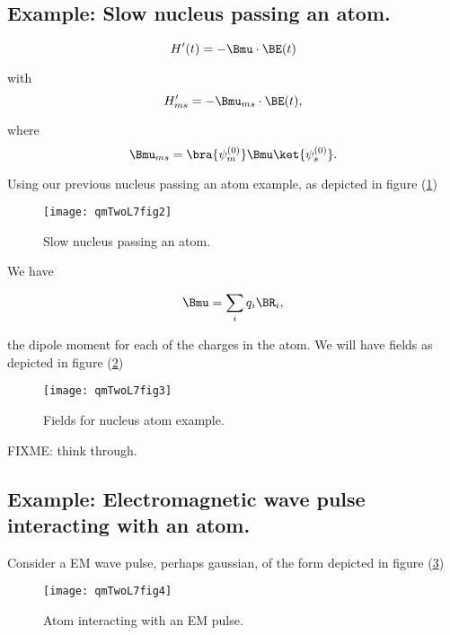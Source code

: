 \subsection{Example: Slow nucleus passing an atom.}

\begin{equation}\label{eqn:qmTwoL7:510}
H'(t) = - \Bmu \cdot \BE(t)
\end{equation}

with
\begin{equation}\label{eqn:qmTwoL7:530}
H_{ms}' = -\Bmu_{ms} \cdot \BE(t),
\end{equation}

where
\begin{equation}\label{eqn:qmTwoL7:550}
\Bmu_{ms} =
\bra{\psi_m^{(0)}}
\Bmu
\ket{\psi_s^{(0)}}.
\end{equation}

Using our previous nucleus passing an atom example, as depicted in figure (\ref{fig:qmTwoL7fig2})

\begin{figure}[htp]
\centering
\texttt{[image: qmTwoL7fig2]}
\caption{Slow nucleus passing an atom.}\label{fig:qmTwoL7fig2}
\end{figure}

We have

\begin{equation}\label{eqn:qmTwoL7:570}
\Bmu = \sum_i q_i \BR_i,
\end{equation}

the dipole moment for each of the charges in the atom.  We will have fields as depicted in figure (\ref{fig:qmTwoL7fig3})

\begin{figure}[htp]
\centering
\texttt{[image: qmTwoL7fig3]}
\caption{Fields for nucleus atom example.}\label{fig:qmTwoL7fig3}
\end{figure}

FIXME: think through.

\subsection{Example: Electromagnetic wave pulse interacting with an atom.}

Consider a EM wave pulse, perhaps gaussian, of the form depicted in figure (\ref{fig:qmTwoL7fig4})

\begin{figure}[htp]
\centering
\texttt{[image: qmTwoL7fig4]}
\caption{Atom interacting with an EM pulse.}\label{fig:qmTwoL7fig4}
\end{figure}

